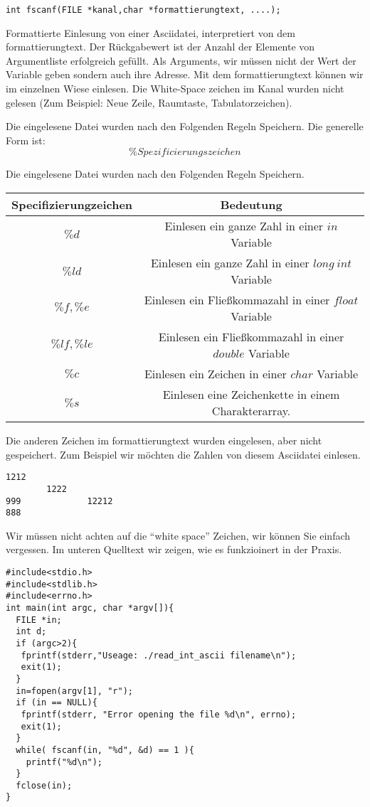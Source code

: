 \documentclass{article}[12pt]
\newenvironment{myexampleblock}[1]{%
    \tcolorbox[beamer,%
    noparskip,breakable,
    colback=White,colframe=ForestGreen,%
    colbacklower=LimeGreen!75!White,%
    title=#1]}%
    {\endtcolorbox}
\begin{document}
\begin{myexampleblock}{Funktion: \texttt{fscanf}}
\begin{lstlisting}
int fscanf(FILE *kanal,char *formattierungtext, ....);
\end{lstlisting}
Formattierte Einlesung von einer Asciidatei, interpretiert von dem formattierungtext. Der Rückgabewert ist der
Anzahl der Elemente von Argumentliste erfolgreich gefüllt. Als Arguments, wir müssen nicht der Wert der Variable geben
sondern auch ihre Adresse. Mit dem formattierungtext können wir im einzelnen Wiese einlesen.
Die White-Space zeichen im Kanal wurden nicht gelesen (Zum Beispiel: Neue Zeile, Raumtaste, Tabulatorzeichen).

Die eingelesene Datei wurden nach den Folgenden Regeln Speichern. Die generelle Form ist:
$$\%Spezificierungszeichen$$

Die eingelesene Datei wurden nach den Folgenden Regeln Speichern. 

\begin{center}
\begin{tabular}{|cc|}
\hline
Specifizierungzeichen & Bedeutung \\\hline
$\%d$	&  Einlesen ein ganze Zahl in einer $in$ Variable \\
$\%ld$  &  Einlesen ein ganze Zahl in einer $long~int$ Variable \\
$\%f,\%e$   & Einlesen ein Fließkommazahl in einer $float$ Variable \\
$\%lf,\%le$  & Einlesen ein Fließkommazahl in einer $double$ Variable \\
$\%c$  & Einlesen ein Zeichen in einer $char$ Variable \\
$\%s$  & Einlesen eine Zeichenkette in einem Charakterarray.\\
\hline
\end{tabular}
\end{center}

Die anderen Zeichen im formattierungtext wurden eingelesen, aber nicht gespeichert. 
\end{myexampleblock}
Zum Beispiel wir möchten die Zahlen von diesem Asciidatei einlesen.
\begin{lstlisting}
1212
        1222
999             12212
888
\end{lstlisting}
Wir müssen nicht achten auf die ``white space'' Zeichen, wir können Sie einfach vergessen.
Im unteren Quelltext wir zeigen, wie es funkzioinert in der Praxis.
\begin{lstlisting}
#include<stdio.h>
#include<stdlib.h>
#include<errno.h>
int main(int argc, char *argv[]){
  FILE *in;
  int d;
  if (argc>2){
   fprintf(stderr,"Useage: ./read_int_ascii filename\n");
   exit(1);
  }
  in=fopen(argv[1], "r");
  if (in == NULL){
   fprintf(stderr, "Error opening the file %d\n", errno);
   exit(1);
  }
  while( fscanf(in, "%d", &d) == 1 ){
    printf("%d\n");
  }
  fclose(in);
}
\end{lstlisting}
\end{document}
